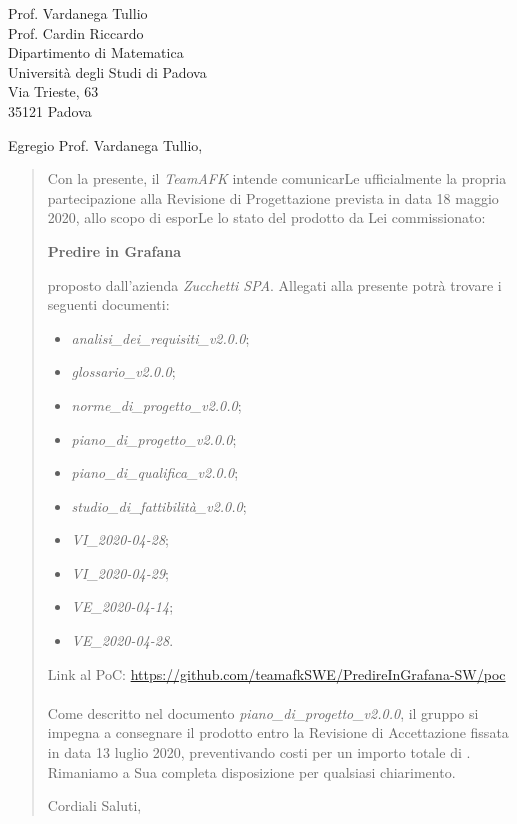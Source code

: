 \begin{letter}{
		Prof. Vardanega Tullio \\
		Prof. Cardin Riccardo \\
		Dipartimento di Matematica \\
		Università degli Studi di Padova \\
		Via Trieste, 63 \\
		35121 Padova}
		
\opening{Egregio Prof. Vardanega Tullio,}

\begin{quotation}
Con la presente, il \textit{TeamAFK} intende comunicarLe ufficialmente la propria partecipazione alla Revisione di Progettazione prevista in data 18 maggio 2020, allo scopo di esporLe lo stato del prodotto da Lei commissionato:

\begin{center}
	\textbf{Predire in Grafana}
\end{center}

\noindent proposto dall'azienda \textit{Zucchetti SPA}.
Allegati alla presente potrà trovare i seguenti documenti:
\begin{itemize}
	\item \textit{analisi\_dei\_requisiti\_v2.0.0};
	
	\item \textit{glossario\_v2.0.0};
	
	\item \textit{norme\_di\_progetto\_v2.0.0};

	\item \textit{piano\_di\_progetto\_v2.0.0};

	\item \textit{piano\_di\_qualifica\_v2.0.0};

	\item \textit{studio\_di\_fattibilità\_v2.0.0};
	\item \textit{VI\_2020-04-28};
	\item \textit{VI\_2020-04-29};
	\item \textit{VE\_2020-04-14};
	\item \textit{VE\_2020-04-28}.
\end{itemize}
\noindent 
Link al PoC: \href{https://github.com/teamafkSWE/PredireInGrafana-SW/tree/master/poc} {https://github.com/teamafkSWE/PredireInGrafana-SW/poc}\\ \\
Come descritto nel documento \textit{piano\_di\_progetto\_v2.0.0}, il gruppo si impegna a consegnare il prodotto entro la Revisione di Accettazione fissata in data 13 luglio 2020, preventivando costi per un importo totale di \textbf{}.\\
Rimaniamo a Sua completa disposizione per qualsiasi chiarimento.

\vspace{0.5cm}
\closing{ Cordiali Saluti,}
	

\end{quotation}
		
\end{letter}